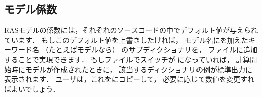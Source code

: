 


\subsection{モデル係数}
\label{ssec:7.2.1}
RASモデルの係数には，それぞれのソースコードの中でデフォルト値が与えられています．
もしこのデフォルト値を上書きしたければ，
モデル名にを加えたキーワード名
（たとえばモデルなら）
のサブディクショナリを，
ファイルに追加することで実現できます．
もしファイルでスイッチが
になっていれば，
計算開始時にモデルが作成されたときに，
該当するディクショナリの例が標準出力に表示されます．
ユーザは，これをにコピーして，
必要に応じて数値を変更すればよいでしょう．


